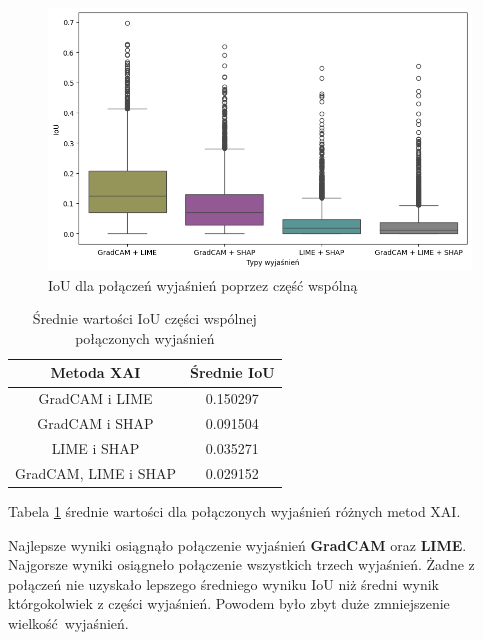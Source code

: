 \begin{figure}[h]
	\centering\includegraphics[width=.9\textwidth]{img/combine_iou_and}
	\caption{IoU dla połączeń wyjaśnień poprzez część wspólną}  \label{rys:combine_iou_and}
\end{figure}
\begin{table}[h]
	\centering
	\begin{tabular}{|c|c|}
		\hline
		\textbf{Metoda XAI}  & Średnie IoU \\
		\hline
		GradCAM i LIME       & 0.150297    \\
		\hline
		GradCAM i SHAP       & 0.091504    \\
		\hline
		LIME i SHAP          & 0.035271    \\
		\hline
		GradCAM, LIME i SHAP & 0.029152    \\
		\hline
	\end{tabular}
	\caption{Średnie wartości IoU części wspólnej połączonych wyjaśnień}
	\label{tab:combineandiouand}
\end{table}
Tabela \ref{tab:combineandiouand} średnie wartości dla połączonych wyjaśnień różnych metod XAI.

Najlepsze wyniki osiągnąło połączenie wyjaśnień \textbf{GradCAM} oraz \textbf{LIME}.
Najgorsze wyniki osiągneło połączenie wszystkich trzech wyjaśnień.
Żadne z połączeń nie uzyskało lepszego średniego wyniku IoU niż średni wynik którgokolwiek z części wyjaśnień.
Powodem było zbyt duże zmniejszenie wielkość wyjaśnień.

\vspace{1cm}

